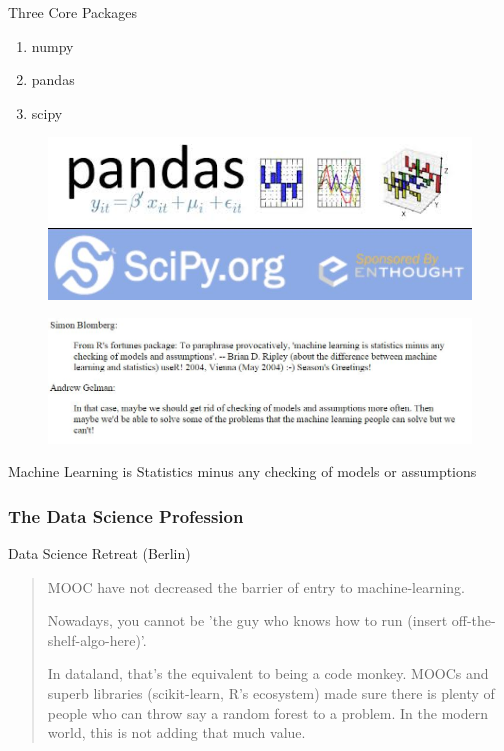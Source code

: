 \documentclass{beamer}
\begin{document}
%
\begin{frame}
	\huge
	Three Core Packages
	\begin{enumerate}
		\item numpy
		\item pandas
		\item scipy
	\end{enumerate}
	\begin{figure}
\centering
\includegraphics[width=0.7\linewidth]{pandaslogo}\\
\includegraphics[width=0.7\linewidth]{scipylogo}

\end{figure}

\end{frame}



\begin{frame}
	\begin{figure}
		\centering
		\includegraphics[width=1.1\linewidth]{machinelearningquotes}
	\end{figure}
	\Large Machine Learning is Statistics minus any checking of models or assumptions
\end{frame}
\begin{frame}
	\frametitle{The Data Science Profession}
	Data Science Retreat (Berlin)
	\begin{quote}
		MOOC have not  decreased the barrier of entry to machine-learning.
		
		
		
		Nowadays, you cannot be 'the guy who knows how to run (insert off-the-shelf-algo-here)'. 
		
		
		In dataland, that's the equivalent to being a code monkey. MOOCs and superb libraries (scikit-learn, R's ecosystem) made 
		sure there is plenty of people who can throw say a random forest to a problem. In the modern world, this is not adding that much value. 
	\end{quote}
\end{frame}
\end{document}
